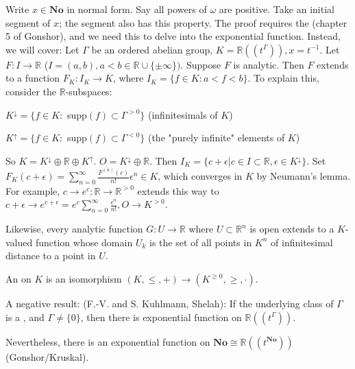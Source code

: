 
Write $x \in \mathbf{No}$ in normal form. Say all powers of $\omega$ are positive. Take an initial segment of $x$; the segment also has this property. The proof requires the  (chapter 5 of Gonshor), and we need this to delve into the exponential function. Instead, we will cover:
Let $\Gamma$ be an ordered abelian group, $K = \mathbb{R}((t^{\Gamma})), x=t^{-1}$. Let $F: I \rightarrow \mathbb{R}$ ($I=(a, b), a<b \in \mathbb{R} \cup \{\pm \infty \})$. Suppose $F$ is analytic. Then $F$ extends to a function $F_K : I_K \rightarrow K$, where $I_K = \{f \in K: a<f<b\}$. To explain this, consider the $\mathbb{R}$-subspaces:

$K^{\downarrow}=\{f \in K:$ supp$(f) \subset \Gamma^{> 0} \}$ (infinitesimals of $K$)

$K^{\uparrow}=\{f \in K:$ supp$(f) \subset \Gamma^{< 0} \}$ (the "purely infinite" elements of $K$)

So $K=K^{\downarrow} \oplus \mathbb{R} \oplus K^{\uparrow}$. $O=K^{\downarrow} \oplus \mathbb{R}$. Then $I_K=\{c+\epsilon | c \in I \subset \mathbb{R}, \epsilon \in K^{\downarrow}\}$. Set $F_K (c+\epsilon)=\sum_{n=0}^{\infty} \frac{F^{(n)}(c)}{n!}\epsilon^{n} \in K$, which converges in $K$ by Neumann's lemma. For example, $c \rightarrow e^c: \mathbb{R} \rightarrow \mathbb{R}^{> 0}$ extends this way to $c+\epsilon \rightarrow e^{c+\epsilon}=e^c \sum_{n=0}^{\infty} \frac{\epsilon^n}{n!}, O \rightarrow K^{> 0}$.

Likewise, every analytic function $G: U \rightarrow \mathbb{R}$ where $U \subset \mathbb{R}^n$ is open extends to a $K$-valued function whose domain $U_k$ is the set of all points in $K^n$ of infinitesimal distance to a point in $U$.


An  on $K$ is an isomorphism $(K, \leq, +) \rightarrow (K^{\geq 0}, \geq, \cdot).$

A negative result:
 (F.-V. and S. Kuhlmann, Shelah): If the underlying class of $\Gamma$ is a , and $\Gamma \neq \{0\}$, then there is  exponential function on $\mathbb{R}((t^{\Gamma}))$.

Nevertheless, there is an exponential function on $\mathbf{No} \cong \mathbb{R}((t^{\mathbf{No}}))$ (Gonshor/Kruskal).

